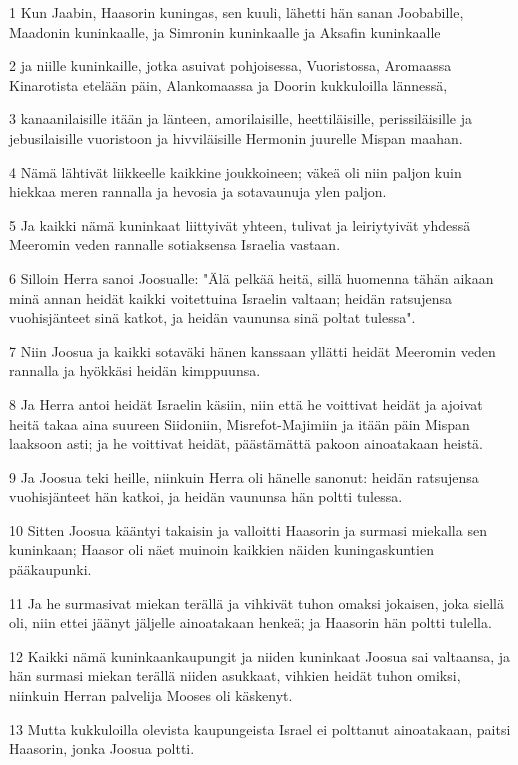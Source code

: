 \par 1 Kun Jaabin, Haasorin kuningas, sen kuuli, lähetti hän sanan Joobabille, Maadonin kuninkaalle, ja Simronin kuninkaalle ja Aksafin kuninkaalle
\par 2 ja niille kuninkaille, jotka asuivat pohjoisessa, Vuoristossa, Aromaassa Kinarotista etelään päin, Alankomaassa ja Doorin kukkuloilla lännessä,
\par 3 kanaanilaisille itään ja länteen, amorilaisille, heettiläisille, perissiläisille ja jebusilaisille vuoristoon ja hivviläisille Hermonin juurelle Mispan maahan.
\par 4 Nämä lähtivät liikkeelle kaikkine joukkoineen; väkeä oli niin paljon kuin hiekkaa meren rannalla ja hevosia ja sotavaunuja ylen paljon.
\par 5 Ja kaikki nämä kuninkaat liittyivät yhteen, tulivat ja leiriytyivät yhdessä Meeromin veden rannalle sotiaksensa Israelia vastaan.
\par 6 Silloin Herra sanoi Joosualle: "Älä pelkää heitä, sillä huomenna tähän aikaan minä annan heidät kaikki voitettuina Israelin valtaan; heidän ratsujensa vuohisjänteet sinä katkot, ja heidän vaununsa sinä poltat tulessa".
\par 7 Niin Joosua ja kaikki sotaväki hänen kanssaan yllätti heidät Meeromin veden rannalla ja hyökkäsi heidän kimppuunsa.
\par 8 Ja Herra antoi heidät Israelin käsiin, niin että he voittivat heidät ja ajoivat heitä takaa aina suureen Siidoniin, Misrefot-Majimiin ja itään päin Mispan laaksoon asti; ja he voittivat heidät, päästämättä pakoon ainoatakaan heistä.
\par 9 Ja Joosua teki heille, niinkuin Herra oli hänelle sanonut: heidän ratsujensa vuohisjänteet hän katkoi, ja heidän vaununsa hän poltti tulessa.
\par 10 Sitten Joosua kääntyi takaisin ja valloitti Haasorin ja surmasi miekalla sen kuninkaan; Haasor oli näet muinoin kaikkien näiden kuningaskuntien pääkaupunki.
\par 11 Ja he surmasivat miekan terällä ja vihkivät tuhon omaksi jokaisen, joka siellä oli, niin ettei jäänyt jäljelle ainoatakaan henkeä; ja Haasorin hän poltti tulella.
\par 12 Kaikki nämä kuninkaankaupungit ja niiden kuninkaat Joosua sai valtaansa, ja hän surmasi miekan terällä niiden asukkaat, vihkien heidät tuhon omiksi, niinkuin Herran palvelija Mooses oli käskenyt.
\par 13 Mutta kukkuloilla olevista kaupungeista Israel ei polttanut ainoatakaan, paitsi Haasorin, jonka Joosua poltti.
